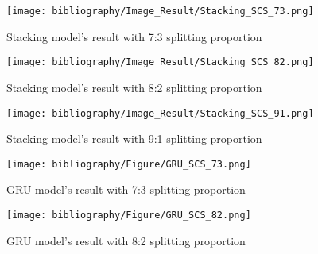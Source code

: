 \documentclass{ieeeojies}
\begin{document}
\begin{figure}[H]
  \centering
  \begin{minipage}{0.8\linewidth}
    \centering
    \texttt{[image: bibliography/Image\_Result/Stacking\_SCS\_73.png]}
    \caption{Stacking model's result with 7:3 splitting proportion}
    \label{fig8}
  \end{minipage}
\end{figure}

\begin{figure}[H]
  \centering
  \begin{minipage}{0.8\linewidth}
    \centering
    \texttt{[image: bibliography/Image\_Result/Stacking\_SCS\_82.png]}
    \caption{Stacking model's result with 8:2 splitting proportion}
    \label{fig9}
  \end{minipage}
\end{figure}

\begin{figure}[H]
  \centering
  \begin{minipage}{0.8\linewidth}
    \centering
    \texttt{[image: bibliography/Image\_Result/Stacking\_SCS\_91.png]}
    \caption{Stacking model's result with 9:1 splitting proportion}
    \label{fig8}
  \end{minipage}
\end{figure}

\begin{figure}[H]
  \centering
  \begin{minipage}{0.8\linewidth}
    \centering
    \texttt{[image: bibliography/Figure/GRU\_SCS\_73.png]}
    \caption{GRU model's result with 7:3 splitting proportion}
    \label{fig9}
  \end{minipage}
\end{figure}

\begin{figure}[H]
  \centering
  \begin{minipage}{0.8\linewidth}
    \centering
    \texttt{[image: bibliography/Figure/GRU\_SCS\_82.png]}
    \caption{GRU model's result with 8:2 splitting proportion}
    \label{fig8}
  \end{minipage}
\end{figure}
\end{document}
